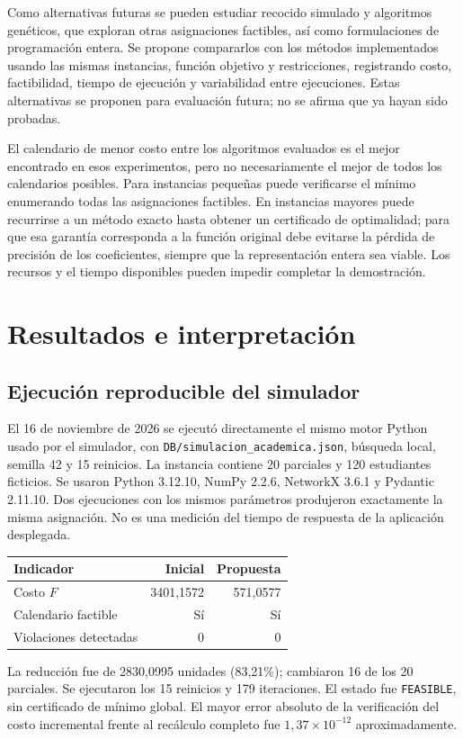 \documentclass[conference]{IEEEtran}
\begin{document}
Como alternativas futuras se pueden estudiar recocido simulado y algoritmos genéticos, que exploran otras asignaciones factibles, así como formulaciones de programación entera. Se propone compararlos con los métodos implementados usando las mismas instancias, función objetivo y restricciones, registrando costo, factibilidad, tiempo de ejecución y variabilidad entre ejecuciones. Estas alternativas se proponen para evaluación futura; no se afirma que ya hayan sido probadas.

El calendario de menor costo entre los algoritmos evaluados es el mejor encontrado en esos experimentos, pero no necesariamente el mejor de todos los calendarios posibles. Para instancias pequeñas puede verificarse el mínimo enumerando todas las asignaciones factibles. En instancias mayores puede recurrirse a un método exacto hasta obtener un certificado de optimalidad; para que esa garantía corresponda a la función original debe evitarse la pérdida de precisión de los coeficientes, siempre que la representación entera sea viable. Los recursos y el tiempo disponibles pueden impedir completar la demostración.

\section{Resultados e interpretación}
\subsection{Ejecución reproducible del simulador}
El 16 de noviembre de 2026 se ejecutó directamente el mismo motor Python usado por el simulador, con \texttt{DB/simulacion\_academica.json}, búsqueda local, semilla 42 y 15 reinicios. La instancia contiene 20 parciales y 120 estudiantes ficticios. Se usaron Python 3.12.10, NumPy 2.2.6, NetworkX 3.6.1 y Pydantic 2.11.10. Dos ejecuciones con los mismos parámetros produjeron exactamente la misma asignación. No es una medición del tiempo de respuesta de la aplicación desplegada.

\begin{center}
\begin{tabular}{lrr}
\toprule
Indicador & Inicial & Propuesta\\
\midrule
Costo $F$ & 3401,1572 & 571,0577\\
Calendario factible & Sí & Sí\\
Violaciones detectadas & 0 & 0\\
\bottomrule
\end{tabular}
\end{center}
La reducción fue de 2830,0995 unidades (83,21\%); cambiaron 16 de los 20 parciales. Se ejecutaron los 15 reinicios y 179 iteraciones. El estado fue \texttt{FEASIBLE}, sin certificado de mínimo global. El mayor error absoluto de la verificación del costo incremental frente al recálculo completo fue $1,37\times10^{-12}$ aproximadamente.
\end{document}
